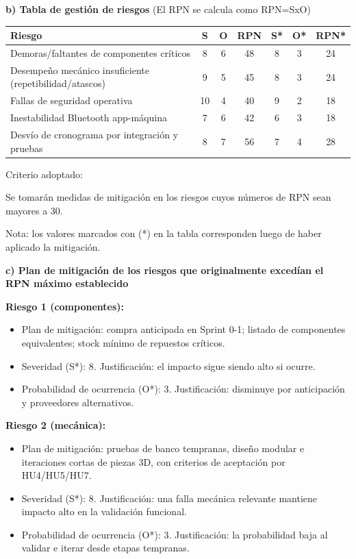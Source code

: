 ﻿\documentclass[
11pt, %
]{charter}
\begin{document}
\textbf{b) Tabla de gestión de riesgos} (El RPN se calcula como RPN=SxO)

\begin{table}[htpb]
\centering
\begin{tabularx}{\linewidth}{@{}|X|c|c|c|c|c|c|@{}}
\hline
\rowcolor[HTML]{C0C0C0} 
Riesgo & S & O & RPN & S* & O* & RPN* \\ \hline
Demoras/faltantes de componentes críticos & 8 & 6 & 48 & 8 & 3 & 24 \\ \hline
Desempeño mecánico insuficiente (repetibilidad/atascos) & 9 & 5 & 45 & 8 & 3 & 24 \\ \hline
Fallas de seguridad operativa & 10 & 4 & 40 & 9 & 2 & 18 \\ \hline
Inestabilidad Bluetooth app-máquina & 7 & 6 & 42 & 6 & 3 & 18 \\ \hline
Desvío de cronograma por integración y pruebas & 8 & 7 & 56 & 7 & 4 & 28 \\ \hline
\end{tabularx}%
\end{table}

Criterio adoptado:

Se tomarán medidas de mitigación en los riesgos cuyos números de RPN sean mayores a 30.

Nota: los valores marcados con (*) en la tabla corresponden luego de haber aplicado la mitigación.

\textbf{c) Plan de mitigación de los riesgos que originalmente excedían el RPN máximo establecido}

\textbf{Riesgo 1 (componentes):}
\begin{itemize}
	\item Plan de mitigación: compra anticipada en Sprint 0-1; listado de componentes equivalentes; stock mínimo de repuestos críticos.
	\item Severidad (S*): 8. Justificación: el impacto sigue siendo alto si ocurre.
	\item Probabilidad de ocurrencia (O*): 3. Justificación: disminuye por anticipación y proveedores alternativos.
\end{itemize}

\textbf{Riesgo 2 (mecánica):}
\begin{itemize}
	\item Plan de mitigación: pruebas de banco tempranas, diseño modular e iteraciones cortas de piezas 3D, con criterios de aceptación por HU4/HU5/HU7.
	\item Severidad (S*): 8. Justificación: una falla mecánica relevante mantiene impacto alto en la validación funcional.
	\item Probabilidad de ocurrencia (O*): 3. Justificación: la probabilidad baja al validar e iterar desde etapas tempranas.
\end{itemize}
\end{document}
